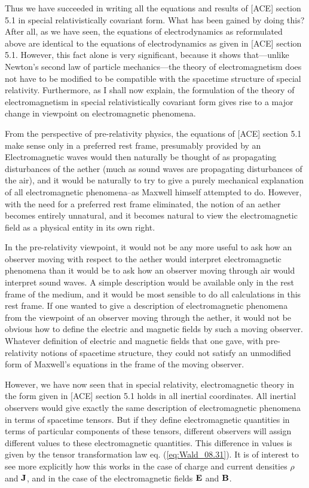 Thus we have succeeded in writing all the equations and results of [ACE] section 5.1 in special relativistically covariant form. What has been gained by doing this? After all, as we have seen, the equations of electrodynamics as reformulated above are identical to the equations of electrodynamics as given in [ACE] section 5.1. However, this fact alone is very significant, because it shows that---unlike Newton's second law of particle mechanics---the theory of electromagnetism does not have to be modified to be compatible with the spacetime structure of special relativity. Furthermore, as I shall now explain, the formulation of the theory of electromagnetism in special relativistically covariant form gives rise to a major change in viewpoint on electromagnetic phenomena. 

From the perspective of pre-relativity physics, the equations of [ACE] section 5.1 make sense only in a preferred rest frame, presumably provided by an  Electromagnetic waves would then naturally be thought of as propagating disturbances of the aether (much as sound waves are propagating disturbances of the air), and it would be naturally to try to give a purely mechanical explanation of all electromagnetic phenomena--as Maxwell himself attempted to do. However, with the need for a preferred rest frame eliminated, the notion of an aether becomes entirely unnatural, and it becomes natural to view the electromagnetic field as a physical entity in its own right.

In the pre-relativity viewpoint, it would not be any more useful to ask how an observer moving with respect to the aether would interpret electromagnetic phenomena than it would be to ask how an observer moving through air would interpret sound waves. A simple description would be available only in the rest frame of the medium, and it would be most sensible to do all calculations in this rest frame. If one wanted to give a description of electromagnetic phenomena from the viewpoint of an observer moving through the aether, it would not be obvious how to define the electric and magnetic fields  by such a moving observer. Whatever definition of electric and magnetic fields that one gave, with pre-relativity notions of spacetime structure, they could not satisfy an unmodified form of Maxwell's equations in the frame of the moving observer.

However, we have now seen that in special relativity, electromagnetic theory in the form given in [ACE] section 5.1 holds in all inertial coordinates. All inertial observers would give exactly the same description of electromagnetic phenomena in terms of spacetime tensors. But if they define electromagnetic quantities in terms of particular components of these tensors, different observers  will assign different values to these electromagnetic quantities. This difference in values is given by the tensor transformation law eq. (\ref{eq:Wald_08.31}). It is of interest to see more explicitly how this works in the case of charge and current densities $\rho$ and $\vb{J}$, and in the case of the electromagnetic fields $\vb{E}$ and $\vb{B}$.

